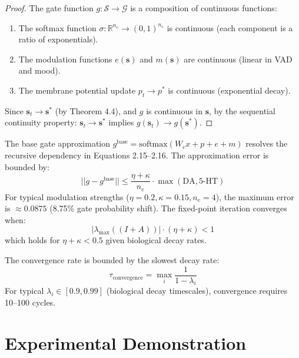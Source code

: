 \documentclass[preprint,12pt]{elsarticle}
\newcommand{\R}{\mathbb{R}}
\begin{document}
\begin{proof}
The gate function $g: \mathcal{S} \rightarrow \mathcal{G}$ is a composition of continuous functions:
\begin{enumerate}
\item The softmax function $\sigma: \R^{n_e} \rightarrow (0,1)^{n_e}$ is continuous (each component is a ratio of exponentials).
\item The modulation functions $e(\mathbf{s})$ and $m(\mathbf{s})$ are continuous (linear in VAD and mood).
\item The membrane potential update $p_t \rightarrow p^*$ is continuous (exponential decay).
\end{enumerate}
Since $\mathbf{s}_t \rightarrow \mathbf{s}^*$ (by Theorem 4.4), and $g$ is continuous in $\mathbf{s}$, by the sequential continuity property: $\mathbf{s}_t \rightarrow \mathbf{s}^*$ implies $g(\mathbf{s}_t) \rightarrow g(\mathbf{s}^*)$.
\end{proof}

\begin{remark}
The base gate approximation $g^{\text{base}} = \text{softmax}(W_c x + p + e + m)$ resolves the recursive dependency in Equations 2.15--2.16. The approximation error is bounded by:
\begin{equation}
||g - g^{\text{base}}|| \leq \frac{\eta + \kappa}{n_e} \cdot \max(\text{DA}, \text{5-HT})
\end{equation}
For typical modulation strengths ($\eta = 0.2, \kappa = 0.15, n_e = 4$), the maximum error is $\approx 0.0875$ (8.75\% gate probability shift). The fixed-point iteration converges when:
\begin{equation}
|\lambda_{\max}((I + A))| \cdot (\eta + \kappa) < 1
\end{equation}
which holds for $\eta + \kappa < 0.5$ given biological decay rates.
\end{remark}

\begin{corollary}
The convergence rate is bounded by the slowest decay rate:
\begin{equation}
\tau_{\text{convergence}} = \max_i \frac{1}{1 - \lambda_i}
\end{equation}
For typical $\lambda_i \in [0.9, 0.99]$ (biological decay timescales), convergence requires 10--100 cycles.
\end{corollary}

\section{Experimental Demonstration}
\label{sec:experiments}
\end{document}
